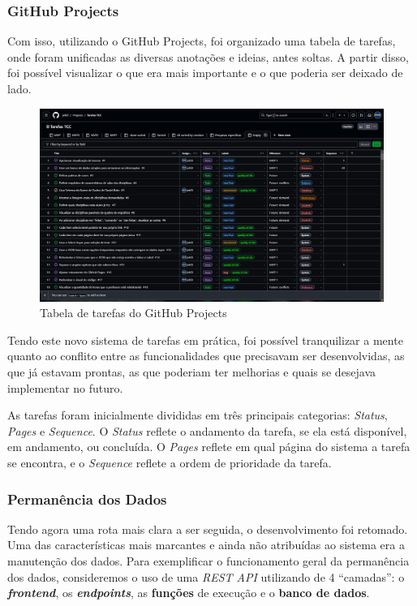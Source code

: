 \subsubsection{GitHub Projects}

Com isso, utilizando o GitHub Projects, foi organizado uma tabela de tarefas, onde foram unificadas as diversas anotações e ideias, antes soltas. A partir disso, foi possível visualizar o que era mais importante e o que poderia ser deixado de lado.

\begin{figure}[htbp]
  \centering
  \caption{Tabela de tarefas do GitHub Projects\label{fig:GitHubProjectsTable}}
  \includegraphics[scale=0.3]{files/img/Codificacao/GitHubProjects - Table.png}
  \legend{\selfAuthor}
\end{figure}

Tendo este novo sistema de tarefas em prática, foi possível tranquilizar a mente quanto ao conflito entre as funcionalidades que precisavam ser desenvolvidas, as que já estavam prontas, as que poderiam ter melhorias e quais se desejava implementar no futuro.

As tarefas foram inicialmente divididas em três principais categorias: \textit{Status}, \textit{Pages} e \textit{Sequence}. O \textit{Status} reflete o andamento da tarefa, se ela está disponível, em andamento, ou concluída. O \textit{Pages} reflete em qual página do sistema a tarefa se encontra, e o \textit{Sequence} reflete a ordem de prioridade da tarefa.

\subsubsection{Permanência dos Dados}

Tendo agora uma rota mais clara a ser seguida, o desenvolvimento foi retomado. Uma das características mais marcantes e ainda não atribuídas ao sistema era a manutenção dos dados. Para exemplificar o funcionamento geral da permanência dos dados, consideremos o uso de uma \textit{REST API} utilizando de 4 ``camadas'': o \textbf{\textit{frontend}}, os \textbf{\textit{endpoints}}, as \textbf{funções} de execução e o \textbf{banco de dados}.

